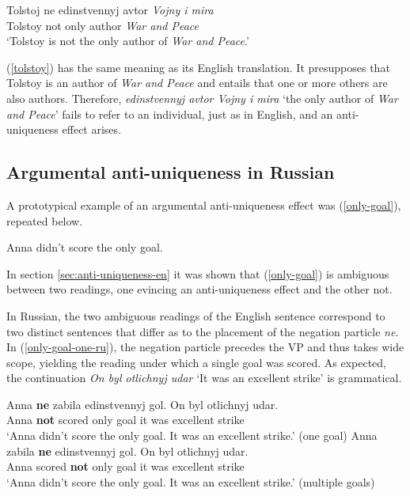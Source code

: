 \documentclass{article}
\begin{document}
\begin{exe}
	\ex \label{tolstoy} \gll Tolstoj ne edinstvennyj avtor \textit{Vojny i mira}\\
	Tolstoy not only author \textit{War and Peace}\\
	\glt `Tolstoy is not the only author of \textit{War and Peace}.'
\end{exe}

(\ref{tolstoy}) has the same meaning as its English translation. It presupposes that Tolstoy is an author of \textit{War and Peace} and entails that one or more others are also authors. Therefore, \textit{edinstvennyj avtor Vojny i mira} `the only author of \textit{War and Peace}' fails to refer to an individual, just as in English, and an anti-uniqueness effect arises.

\subsection{Argumental anti-uniqueness in Russian}
A prototypical example of an argumental anti-uniqueness effect was (\ref{only-goal}), repeated below.

\begin{exe}
	\ex Anna didn't score the only goal.
\end{exe}

In section \ref{sec:anti-uniqueness-en} it was shown that (\ref{only-goal}) is ambiguous between two readings, one evincing an anti-uniqueness effect and the other not.

In Russian, the two ambiguous readings of the English sentence correspond to two distinct sentences that differ as to the placement of the negation particle \textit{ne}. In (\ref{only-goal-one-ru}), the negation particle precedes the VP and thus takes wide scope, yielding the reading under which a single goal was scored. As expected, the continuation \textit{On byl otlichnyj udar} `It was an excellent strike' is grammatical.

\begin{exe}
	\ex \label{only-goal-one-ru} \gll Anna \textbf{ne} zabila edinstvennyj gol. On byl otlichnyj udar.\\
	Anna \textbf{not} scored only goal it was excellent strike\\
	\glt `Anna didn't score the only goal. It was an excellent strike.' (one goal)
	\ex \label{only-goal-multiple-ru} \gll Anna zabila \textbf{ne} edinstvennyj gol. On byl otlichnyj udar.\\
	Anna scored \textbf{not} only goal it was excellent strike\\
	\glt `Anna didn't score the only goal. It was an excellent strike.' (multiple goals)
\end{exe}
\end{document}
